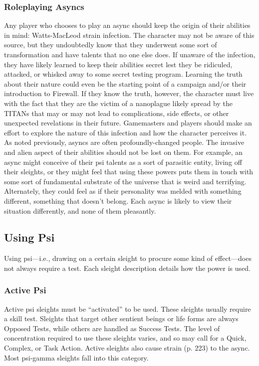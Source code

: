 \subsubsection{Roleplaying Asyncs} 

Any player who chooses to play an async should keep the origin of their abilities in mind: Watts-MacLeod strain infection. The character may not be aware of this source, but they undoubtedly know that they underwent some sort of transformation and have talents that no one else does. If unaware of the infection, they have likely learned to keep their abilities secret lest they be ridiculed, attacked, or whisked away to some secret testing program. Learning the truth about their nature could even be the starting point of a campaign and/or their introduction to Firewall. If they know the truth, however, the character must live with the fact that they are the victim of a nanoplague likely spread by the TITANs that may or may not lead to complications, side effects, or other unexpected revelations in their future. Gamemasters and players should make an effort to explore the nature of this infection and how the character perceives it. As noted previously, asyncs are often profoundly-changed people. The invasive and alien aspect of their abilities should not be lost on them. For example, an async might conceive of their psi talents as a sort of parasitic entity, living off their sleights, or they might feel that using these powers puts them in touch with some sort of fundamental substrate of the universe that is weird and terrifying. Alternately, they could feel as if their personality was melded with something different, something that doesn’t belong. Each async is likely to view their situation differently, and none of them pleasantly. 

\subsection{Using Psi} 

Using psi—i.e., drawing on a certain sleight to procure some kind of effect—does not always require a test. Each sleight description details how the power is used. 

\subsubsection{Active Psi} 

Active psi sleights must be “activated” to be used. These sleights usually require a skill test. Sleights that target other sentient beings or life forms are always Opposed Tests, while others are handled as Success Tests. The level of concentration required to use these sleights varies, and so may call for a Quick, Complex, or Task Action. Active sleights also cause strain (p. 223) to the async. Most psi-gamma sleights fall into this category. 

